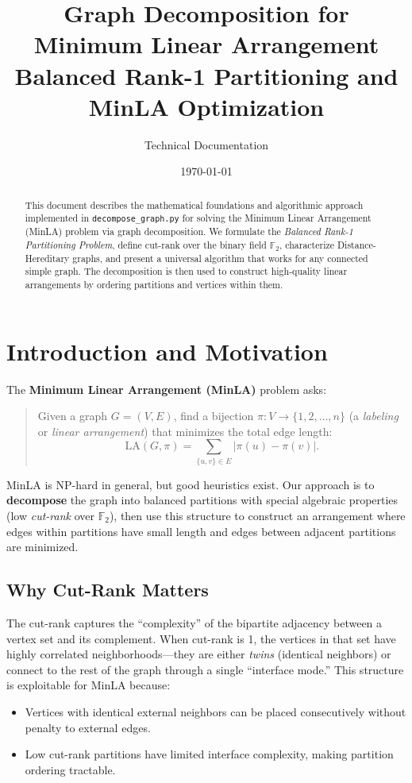 \documentclass[11pt,a4paper]{article}
\title{%
  \textbf{Graph Decomposition for Minimum Linear Arrangement}\\[0.5em]
  \large Balanced Rank-1 Partitioning and MinLA Optimization
}
\author{Technical Documentation}
\date{\today}
\theoremstyle{definition}
\theoremstyle{plain}
\theoremstyle{remark}
\newcommand{\GF}{\mathbb{F}_2}
\begin{document}
\maketitle

\begin{abstract}
This document describes the mathematical foundations and algorithmic approach
implemented in \texttt{decompose\_graph.py} for solving the Minimum Linear
Arrangement (MinLA) problem via graph decomposition. We formulate the
\emph{Balanced Rank-1 Partitioning Problem}, define cut-rank over the
binary field $\GF$, characterize Distance-Hereditary graphs, and present
a universal algorithm that works for any connected simple graph. The
decomposition is then used to construct high-quality linear arrangements
by ordering partitions and vertices within them.
\end{abstract}

\tableofcontents
\newpage

\section{Introduction and Motivation}

The \textbf{Minimum Linear Arrangement (MinLA)} problem asks:
\begin{quote}
Given a graph $G = (V, E)$, find a bijection $\pi: V \to \{1, 2, \ldots, n\}$
(a \emph{labeling} or \emph{linear arrangement}) that minimizes the total
edge length:
\[
  \mathrm{LA}(G, \pi) = \sum_{\{u,v\} \in E} |\pi(u) - \pi(v)|.
\]
\end{quote}

MinLA is NP-hard in general, but good heuristics exist. Our approach is to
\textbf{decompose} the graph into balanced partitions with special algebraic
properties (low \emph{cut-rank} over $\GF$), then use this structure to
construct an arrangement where edges within partitions have small length
and edges between adjacent partitions are minimized.

\subsection{Why Cut-Rank Matters}

The cut-rank captures the ``complexity'' of the bipartite adjacency between
a vertex set and its complement. When cut-rank is 1, the vertices in that
set have highly correlated neighborhoods---they are either \emph{twins}
(identical neighbors) or connect to the rest of the graph through a single
``interface mode.'' This structure is exploitable for MinLA because:
\begin{itemize}
  \item Vertices with identical external neighbors can be placed consecutively
        without penalty to external edges.
  \item Low cut-rank partitions have limited interface complexity, making
        partition ordering tractable.
\end{itemize}
\end{document}
